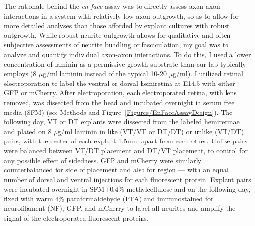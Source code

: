 \label{sec:EnFace}
The rationale behind the \emph{en face} assay was to directly assess axon-axon interactions in a system with relatively low axon outgrowth, so as to allow for more detailed analyses than those afforded by explant cultures with robust outgrowth.
While robust neurite outgrowth allows for qualitative and often subjective assessments of neurite bundling or fasciculation, my goal was to analyze and quantify individual axon-axon interactions.
To do this, I used a lower concentration of laminin as a permissive growth substrate than our lab typically employs (8 $\mu$g/ml laminin instead of the typical 10-20 $\mu$g/ml).
I utilized \emph{\exvivo{}} retinal electroporation \cite{petros2009utero} to label the ventral or dorsal hemiretina at E14.5 with either GFP or mCherry.
After electroporation, each electroporated retina, with lens removed, was dissected from the head and incubated overnight in serum free media (SFM) (see Methods and Figure~\ref{Figures/EnFaceAssayDesign}).
The following day, VT or DT explants were dissected from the labeled hemiretinae and plated on 8 $\mu$g/ml laminin in like (VT/VT or DT/DT) or unlike (VT/DT) pairs, with the center of each explant 1.5mm apart from each other.
Unlike pairs were balanced between VT/DT placement and DT/VT placement, to control for any possible effect of sidedness.
GFP and mCherry were similarly counterbalanced for side of placement and also for region --- with an equal number of dorsal and ventral injections for each fluorescent protein.
Explant pairs were incubated overnight in SFM+0.4\% methylcellulose and on the following day, fixed with warm 4\% paraformaldehyde (PFA) and immunostained for neurofilament (NF), GFP, and mCherry to label all neurites and amplify the signal of the electroporated fluorescent proteins.

